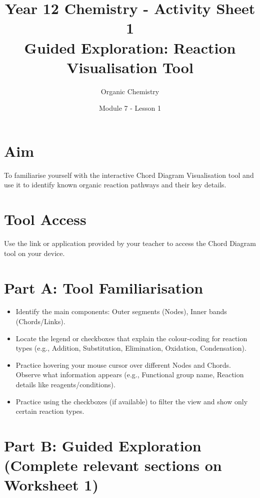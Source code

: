 \documentclass[11pt, a4paper]{article} %
\title{Year 12 Chemistry - Activity Sheet 1 \\ Guided Exploration: Reaction Visualisation Tool}
\date{Module 7 - Lesson 1}
\author{Organic Chemistry}
\begin{document}
\maketitle

\section*{Aim}
To familiarise yourself with the interactive Chord Diagram Visualisation tool and use it to identify known organic reaction pathways and their key details.

\section*{Tool Access}
Use the link or application provided by your teacher to access the Chord Diagram tool on your device.

\section*{Part A: Tool Familiarisation}
\begin{itemize}
    \item Identify the main components: Outer segments (Nodes), Inner bands (Chords/Links).
    \item Locate the legend or checkboxes that explain the colour-coding for reaction types (e.g., Addition, Substitution, Elimination, Oxidation, Condensation).
    \item Practice hovering your mouse cursor over different Nodes and Chords. Observe what information appears (e.g., Functional group name, Reaction details like reagents/conditions).
    \item Practice using the checkboxes (if available) to filter the view and show only certain reaction types.
\end{itemize}

\section*{Part B: Guided Exploration (Complete relevant sections on Worksheet 1)}
\end{document}
